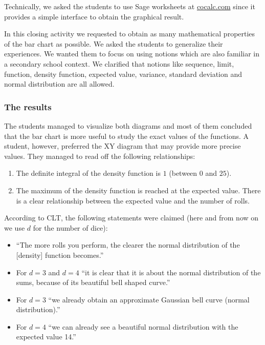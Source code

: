\documentclass[]{interact}
\theoremstyle{plain}%
\theoremstyle{definition}
\theoremstyle{remark}
\begin{document}
Technically, we asked the students to use
Sage worksheets at \url{cocalc.com} since it provides a simple interface to obtain
the graphical result.

In this closing activity we requested to obtain as many mathematical properties of the bar chart
as possible. We asked the students to generalize their experiences. We wanted them to
focus on using notions which are also familiar in a secondary school context. We clarified
that notions like sequence, limit, function, density function, expected value, variance,
standard deviation and normal distribution are all allowed.

\subsubsection*{The results}

The students managed to visualize both diagrams and most of them concluded that the bar chart is
more useful to study the exact values of the functions. A student, however, preferred the XY diagram
that may provide more precise values.
They managed to read off the following relationships:
\begin{enumerate}
\item The definite integral of the density function is $1$ (between $0$ and $25$).
\item The maximum of the density function is reached at the expected value. There is a clear
relationship between the expected value and the number of rolls.
\end{enumerate}

According to CLT, the following statements were claimed (here and from now on we use $d$
for the number of dice):
\begin{itemize}
\item ``The more rolls you perform, the clearer the normal distribution of the [density] function becomes.''
\item For $d=3$ and $d=4$ ``it is clear that it is about the normal distribution of the sums,
because of its beautiful bell shaped curve.''
\item For $d=3$ ``we already obtain an approximate Gaussian bell curve (normal distribution).''
\item For $d=4$ ``we can already see a beautiful normal distribution with the expected value 14.''
\end{itemize}
\end{document}
